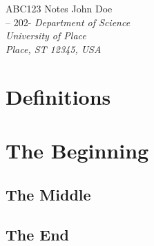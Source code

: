\documentclass[12pt, twoside]{report}
\newcommand{\name}{John Doe}              %
\newcommand{\semester}{-- 202-}        %
\newcommand{\hwTitle}{ABC123 Notes}  %
\begin{document}
\begin{titlepage}
\begin{center}
    \vspace*{1.5in}
    {\Large{\hwTitle}}
    \vskip 0.25in \name\\
    \semester
    \vskip 0.25in {\it Department of Science\\ University of Place\\ Place, ST 12345, USA}
\end{center}
\vskip 0.5in
\end{titlepage}

\pagestyle{empty}       %
\tableofcontents        %

\chapter*{Definitions}  %
\pagestyle{fancy}       %


\chapter{The Beginning}

    \section{The Middle}
    
    
    
    \section[3]{The End}    %
    
\end{document}
